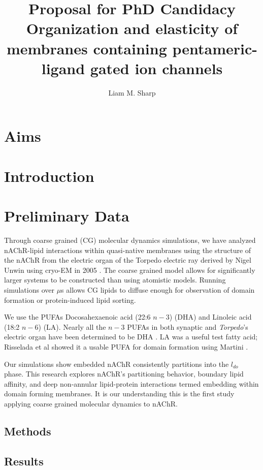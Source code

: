 \documentclass{article}
\author{Liam M. Sharp}
\title{Proposal for PhD Candidacy\\ Organization and elasticity of membranes containing pentameric-ligand gated ion channels}
\begin{document}
\maketitle
\newpage
\tableofcontents
\newpage
\section{Aims}

\newpage
\section{Introduction}
\label{S:1}

\section{Preliminary Data}
Through coarse grained (CG) molecular dynamics simulations, we have analyzed nAChR-lipid interactions within quasi-native membranes using the structure of the nAChR from the electric organ of the Torpedo electric ray derived by Nigel Unwin using cryo-EM in 2005 \cite{Unwin_Refined_2005}. The coarse grained model allows for significantly larger systems to be constructed than using atomistic models. Running simulations over $\mu$s allows CG lipids to diffuse enough for observation of domain formation or protein-induced lipid sorting.

We use the PUFAs Docosahexaenoic acid (22:6 $n-3$) (DHA) and Linoleic acid (18:2 $n-6$) (LA). Nearly all the $n-3$ PUFAs in both synaptic and \textit{Torpedo}'s electric organ have been determined to be DHA \cite{Breckenridge_Adult_1973,Cotman_Lipid_1969,Bara89,Quesada_Uncovering_2016}. LA was a useful test fatty acid; Risselada et al \cite{Risselada_The_2008} showed it a usable PUFA for domain formation using Martini \cite{martini}.

Our simulations show embedded nAChR consistently partitions into the  $l_{do}$ phase. This research explores nAChR's partitioning behavior, boundary lipid affinity, and deep non-annular lipid-protein interactions termed embedding within domain forming membranes. It is our understanding this is the first study applying coarse grained molecular dynamics to nAChR.

\subsection{Methods}
\label{S:2}

\subsection{Results}
\label{S:3}

\end{document}
